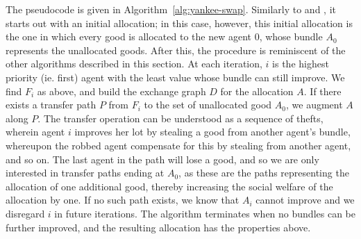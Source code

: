The pseudocode is given in Algorithm~\ref{alg:yankee-swap}. Similarly to  and , it starts out with an initial allocation; in this case, however, this initial allocation is the one in which every good is allocated to the new agent $0$, whose bundle $A_0$ represents the unallocated goods. After this, the procedure is reminiscent of the other algorithms described in this section. At each iteration, $i$ is the highest priority (ie. first) agent with the least value whose bundle can still improve. We find $F_i$ as above, and build the exchange graph $D$ for the allocation $A$. If there exists a transfer path $P$ from $F_i$ to the set of unallocated good $A_0$, we augment $A$ along $P$. The transfer operation can be understood as a sequence of thefts, wherein agent $i$ improves her lot by stealing a good from another agent's bundle, whereupon the robbed agent compensate for this by stealing from another agent, and so on. The last agent in the path will lose a good, and so we are only interested in transfer paths ending at $A_0$, as these are the paths representing the allocation of one additional good, thereby increasing the social welfare of the allocation by one. If no such path exists, we know that $A_i$ cannot improve and we disregard $i$ in future iterations. The algorithm terminates when no bundles can be further improved, and the resulting allocation has the properties above.

